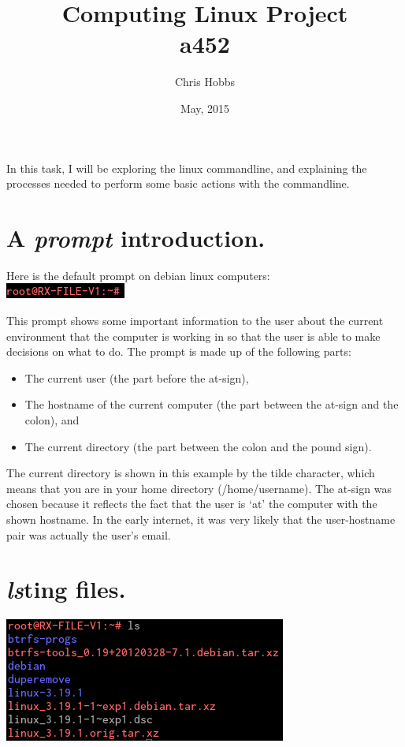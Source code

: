 \documentclass[11pt,twoside,a4paper]{article}
\begin{document}
\title{Computing Linux Project\\
a452}
\author{Chris Hobbs}
\date{May, 2015}
\maketitle

In this task, I will be exploring the linux commandline, and explaining the processes needed to perform some basic actions with the commandline.

\section{A \emph{prompt} introduction.}

Here is the default prompt on debian linux computers:\\
\includegraphics{prompt}

This prompt shows some important information to the user about the current environment that the computer is working in so that the user is able to make decisions on what to do. The prompt is made up of the following parts:
\begin{itemize}
  \item The current user (the part before the at-sign),
  \item The hostname of the current computer (the part between the at-sign and the colon), and
  \item The current directory (the part between the colon and the pound sign).
\end{itemize}

The current directory is shown in this example by the tilde character, which means that you are in your home directory (/home/username). The at-sign was chosen because it reflects the fact that the user is `at' the computer with the shown hostname. In the early internet, it was very likely that the user-hostname pair was actually the user's email.

\section{\emph{ls}ting files.}

\includegraphics{ls}
\end{document}

